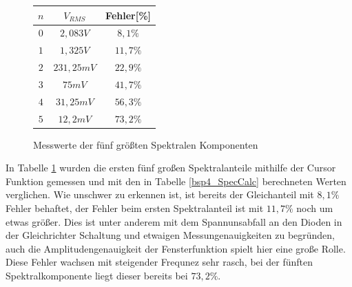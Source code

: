 \begin{figure}[H]
  \begin{center}
    \begin{tabular}{|c|c|c|} \hline
    $n$ & $V_{RMS}$ & Fehler[\%] \\ \hline
    $0$ & $2,083V$  & $8,1\%$   \\ \hline
    $1$ & $1,325V$    & $11,7\%$\\ \hline
    $2$ & $231,25mV$  & $22,9\%$\\ \hline
    $3$ & $75mV$      & $41,7\%$\\ \hline
    $4$ & $31,25mV$   & $56,3\%$\\ \hline
    $5$ & $12,2mV$    & $73,2\%$\\ \hline
    \end{tabular}
  \end{center}
  \caption{Messwerte der f\"unf gr\"o\ss{}ten Spektralen Komponenten} \label{bsp4_SpecMess}
\end{figure}
\noindent
In Tabelle \ref{bsp4_SpecMess} wurden die ersten f\"unf gro\ss{}en Spektralanteile mithilfe der Cursor Funktion gemessen und mit den in Tabelle \ref{bsp4_SpecCalc} berechneten Werten verglichen. Wie unschwer zu erkennen ist, ist bereits der Gleichanteil mit $8,1\%$ Fehler behaftet, der Fehler beim ersten Spektralanteil ist mit $11,7\%$ noch um etwas gr\"o\ss{}er. Dies ist unter anderem mit dem Spannunsabfall an den Dioden in der Gleichrichter Schaltung und etwaigen Messungenauigkeiten zu begr\"unden, auch die Amplitudengenauigkeit der Fensterfunktion spielt hier eine große Rolle. Diese Fehler wachsen mit steigender Frequnez sehr rasch, bei der f\"unften Spektralkomponente liegt dieser bereits bei $73,2\%$.
